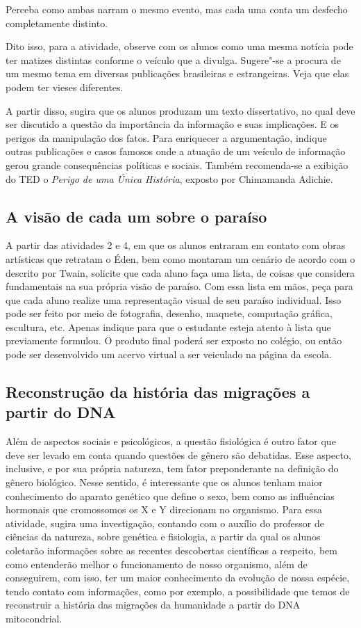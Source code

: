 \documentclass[12pt]{extarticle}
\begin{document}
Perceba como ambas narram o mesmo evento, mas cada uma conta um desfecho
completamente distinto.

Dito isso, para a atividade, observe com os alunos como uma mesma
notícia pode ter matizes distintas conforme o veículo que a divulga.
Sugere"-se a procura de um mesmo tema em diversas publicações brasileiras
e estrangeiras. Veja que elas podem ter vieses diferentes.

A partir disso, sugira que os alunos produzam um texto dissertativo, no
qual deve ser discutido a questão da importância da informação e suas
implicações. E os perigos da manipulação dos fatos. Para enriquecer a
argumentação, indique outras publicações e casos famosos onde a atuação
de um veículo de informação gerou grande consequências políticas e
sociais. Também recomenda-se a exibição do TED o \emph{Perigo de uma
Única História}, exposto por Chimamanda Adichie.

\subsection{A visão de cada um sobre o
paraíso}


A partir das atividades 2 e 4, em que os alunos entraram em contato
com obras artísticas que retratam o Éden, bem como montaram um cenário
de acordo com o descrito por Twain, solicite que cada aluno faça uma
lista, de coisas que considera fundamentais na sua própria visão de
paraíso. Com essa lista em mãos, peça para que cada aluno realize uma
representação visual de seu paraíso individual. Isso pode ser feito
por meio de fotografia, desenho, maquete, computação gráfica,
escultura, etc. Apenas indique para que o estudante esteja atento à
lista que previamente formulou. O produto final poderá ser exposto no
colégio, ou então pode ser desenvolvido um acervo virtual a ser
veiculado na página da escola.

\subsection{Reconstrução da história das
migrações a partir do DNA}


Além de aspectos sociais e psicológicos, a questão fisiológica é outro
fator que deve ser levado em conta quando questões de gênero são
debatidas. Esse aspecto, inclusive, e por sua própria natureza, tem
fator preponderante na definição do gênero biológico. Nesse sentido, é
interessante que os alunos tenham maior conhecimento do aparato
genético que define o sexo, bem como as influências hormonais que
cromossomos os X e Y direcionam no organismo. Para essa atividade,
sugira uma investigação, contando com o auxílio do professor de
ciências da natureza, sobre genética e fisiologia, a partir da qual os
alunos coletarão informações sobre as recentes descobertas científicas
a respeito, bem como entenderão melhor o funcionamento de nosso
organismo, além de conseguirem, com isso, ter um maior conhecimento da
evolução de nossa espécie, tendo contato com informações, como por
exemplo, a possibilidade que temos de reconstruir a história das
migrações da humanidade a partir do DNA mitocondrial.
\end{document}
